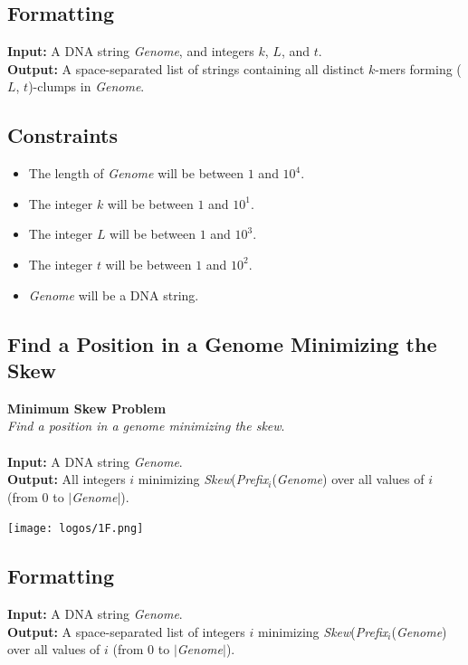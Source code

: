 \documentclass{article}
\begin{document}
\subsection*{Formatting}
\textbf{Input:} A DNA string \emph{Genome}, and integers $k$, $L$, and $t$.\\
\noindent \textbf{Output:} A space-separated list of strings containing all distinct $k$-mers forming ($L$, $t$)-clumps in \emph{Genome}.

\subsection*{Constraints}
\begin{itemize}
    \item The length of \emph{Genome} will be between $1$ and $10^4$.
    \item The integer $k$ will be between $1$ and $10^1$.
    \item The integer $L$ will be between $1$ and $10^3$.
    \item The integer $t$ will be between $1$ and $10^2$.
    \item \emph{Genome} will be a DNA string.
\end{itemize}
\pagebreak
\subsection{Find a Position in a Genome Minimizing the Skew}
\hline\vspace{5}
\noindent \textbf{Minimum Skew Problem}\\
\emph{Find a position in a genome minimizing the skew}.\\ \\
\textbf{Input:} A DNA string \emph{Genome}.\\
\textbf{Output:} All integers $i$ minimizing \emph{Skew}(\emph{Prefix}$_i$(\emph{Genome}) over all values of $i$ (from 0 to $|$\emph{Genome}$|$).
\begin{center}
    \texttt{[image: logos/1F.png]} 
\end{center}
\hline\vspace{5}

\subsection*{Formatting}
\textbf{Input:} A DNA string \emph{Genome}.\\
\noindent \textbf{Output:} A space-separated list of integers $i$ minimizing \emph{Skew}(\emph{Prefix}$_i$(\emph{Genome}) over all values of $i$ (from 0 to $|$\emph{Genome}$|$).
\end{document}
